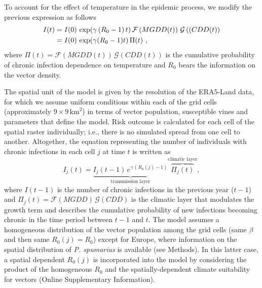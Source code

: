     To account for the effect of temperature in the epidemic process, we modify
    the previous expression as follows
    \begin{align}
        \label{eq: final_eq}
        I(t) & =I(0)\, \exp(\gamma\, (R_0-1)\, t)\,
        \mathcal{F}\left(MGDD(t)\right)\,
        \mathcal{G}\left((CDD(t)\right) \nonumber
        \\
             & =I(0)\, \exp(\gamma(R_0-1)t)\, \Pi(t) \ ,
    \end{align}
    where $\Pi(t)=\mathcal{F}(MGDD(t))\, \mathcal{G}(CDD(t))$ is the cumulative
    probability of chronic infection dependence on temperature and $R_0$ bears
    the
    information on the vector density.

    The spatial unit of the model is given by the resolution of the ERA5-Land
    data, for which we assume uniform conditions within each of the grid cells
    (approximately $9 \times 9\,  \textrm{km}^2$) in terms of vector
    population,
    susceptible vines and parameters that define the model. Risk outcome is
    calculated for each cell of the spatial raster individually; i.e., there is
    no
    simulated spread from one cell to another. Altogether, the equation
    representing the number of individuals with chronic infections in each cell
$j$
    at time $t$ is written as
    \begin{equation}\label{eq:evolution_eq}
        I_j(t)=\underbrace{I_j(t-1) \, e^{\gamma \,
                    (R_0(j)-1)}}_\text{transmission
            layer}	  \overbrace{\Pi_j(t)}^\text{climatic layer} ,
    \end{equation}
    where $I(t-1)$ is the number of chronic infections in the previous year
    ($t-1$) and $\Pi_j(t)=\mathcal{F}(MGDD)\, \mathcal{G}(CDD)$ is the climatic
    layer that modulates the growth term and describes the cumulative
    probability
    of new infections becoming chronic in the time period between $t-1$ and
$t$.
    The model assumes a homogeneous distribution of the vector population among
    the
    grid cells (same $\beta$ and then same $R_0(j) = R_0$) except for Europe,
    where
    information on the spatial distribution of \textit{P. spumarius} is
    available
    (see Methods). In this latter case, a spatial dependent $R_0(j)$ is
    incorporated into the model by considering the product of the homogeneous
$R_0$
    and the spatially-dependent climate suitability for vectors
    (Online Supplementary Information).

